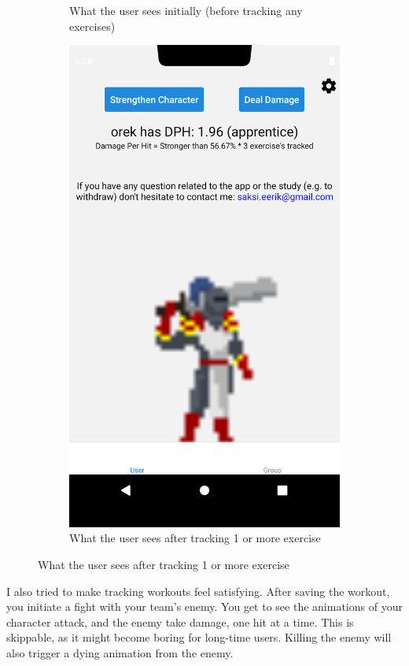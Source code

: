 \documentclass{l4proj}
\begin{document}
\begin{figure}[H]
\begin{subfigure}{0.45\textwidth}
      \caption{What the user sees initially (before tracking any exercises)}
    \end{subfigure}
    \begin{subfigure}{0.45\textwidth}
        \includegraphics[width=\textwidth]{apprentice.png}
        \caption{What the user sees after tracking 1 or more exercise} 
    \end{subfigure}
\end{figure}

I also tried to make tracking workouts feel satisfying. After saving the workout, you initiate a fight with your team's enemy. You get to see the animations of your character attack, and the enemy take damage, one hit at a time. This is skippable, as it might become boring for long-time users. Killing the enemy will also trigger a dying animation from the enemy.
\end{document}
